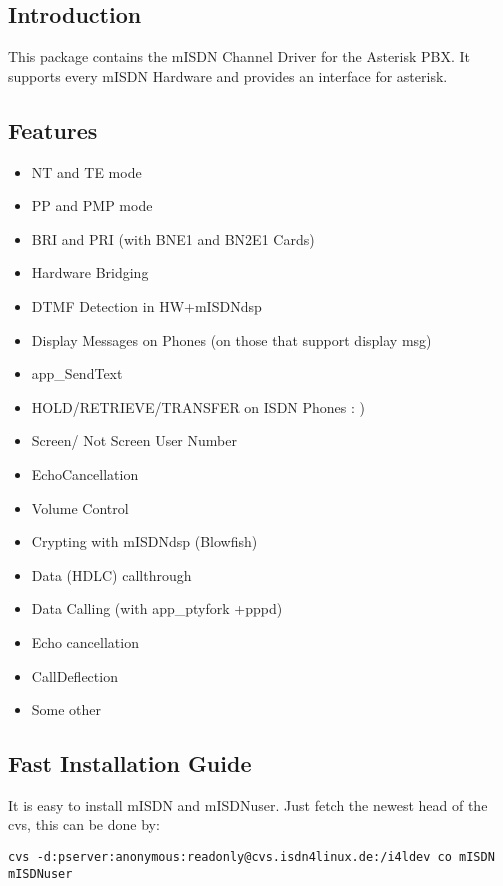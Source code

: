 \subsection{Introduction}

This package contains the mISDN Channel Driver for the Asterisk PBX. It 
supports every mISDN Hardware and provides an interface for asterisk. 

\subsection{Features}

\begin{itemize}
\item  NT and TE mode
\item  PP and PMP mode
\item  BRI and PRI (with BNE1 and BN2E1 Cards)
\item  Hardware Bridging
\item  DTMF Detection in HW+mISDNdsp 
\item  Display Messages on Phones (on those that support display msg)
\item  app\_SendText
\item  HOLD/RETRIEVE/TRANSFER on ISDN Phones : )
\item  Screen/ Not Screen User Number
\item  EchoCancellation 
\item  Volume Control 
\item  Crypting with mISDNdsp (Blowfish)
\item  Data (HDLC) callthrough 
\item  Data Calling (with app\_ptyfork +pppd)
\item  Echo cancellation
\item  CallDeflection
\item Some other
\end{itemize}

\subsection{Fast Installation Guide}

It is easy to install mISDN and mISDNuser. Just fetch the newest head of the
cvs, this can be done by:

\begin{verbatim}
cvs -d:pserver:anonymous:readonly@cvs.isdn4linux.de:/i4ldev co mISDN mISDNuser
\end{verbatim}

